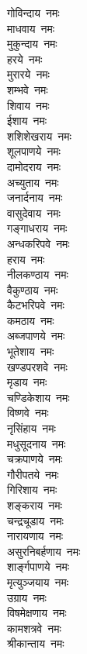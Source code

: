 \begin{multicols}{2}
\begin{flushleft}
गोविन्दाय~नमः\\
माधवाय~नमः\\
मुकुन्दाय~नमः\\
हरये~नमः\\
मुरारये~नमः\\
शम्भवे~नमः\\
शिवाय~नमः\\
ईशाय~नमः\\
शशिशेखराय~नमः\\
शूलपाणये~नमः\hfill{}\\
दामोदराय~नमः\\
अच्युताय~नमः\\
जनार्दनाय~नमः\\
वासुदेवाय~नमः\\
गङ्गाधराय~नमः\\
अन्धकरिपवे~नमः\\
हराय~नमः\\
नीलकण्ठाय~नमः\\
वैकुण्ठाय~नमः\\
कैटभरिपवे~नमः\hfill{}\\
कमठाय~नमः\\
अब्जपाणये~नमः\\
भूतेशाय~नमः\\
खण्डपरशवे~नमः\\
मृडाय~नमः\\
चण्डिकेशाय~नमः\\
विष्णवे~नमः\\
नृसिंहाय~नमः\\
मधुसूदनाय~नमः\\
चक्रपाणये~नमः\hfill{}\\
गौरीपतये~नमः\\
गिरिशाय~नमः\\
शङ्कराय~नमः\\
चन्द्रचूडाय~नमः\\
नारायणाय~नमः\\
असुरनिबर्हणाय~नमः\\
शार्ङ्गपाणये~नमः\\
मृत्युञ्जयाय~नमः\\
उग्राय~नमः\\
विषमेक्षणाय~नमः\hfill{}\\
कामशत्रवे~नमः\\
श्रीकान्ताय~नमः\\

\end{flushleft}
\end{multicols}

